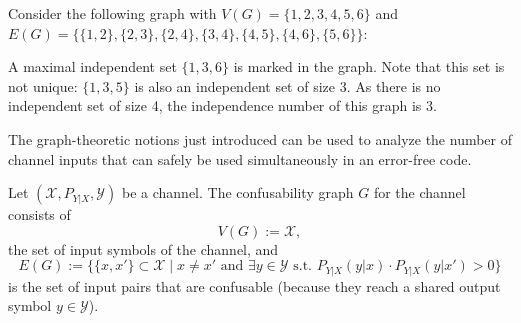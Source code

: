 \begin{example}
Consider the following graph with $V(G) = \{1,2,3,4,5,6\}$ and $E(G) = \{\{1,2\}, \{2,3\}, \{2,4\}, \{3,4\}, \{4,5\}, \{4,6\}, \{5,6\}\}$:
\begin{center}
\end{center}
A maximal independent set $\{1,3,6\}$ is marked in the graph. Note that this set is not unique: $\{1,3,5\}$ is also an independent set of size 3. As there is no independent set of size 4, the independence number of this graph is 3.
\end{example}
The graph-theoretic notions just introduced can be used to analyze the number of channel inputs that can safely be used simultaneously in an error-free code.
\begin{definition}
Let $(\mathcal{X},P_{Y|X},\mathcal{Y})$ be a channel. The confusability graph $G$ for the channel consists of
\[V(G) := \mathcal{X},\]
the set of input symbols of the channel, and
\[
E(G) := \{\{x,x'\} \subset \mathcal{X} \mid x \neq x' \mbox{ and } \exists y \in \mathcal{Y} \mbox{ s.t. } P_{Y|X}(y|x) \cdot P_{Y|X}(y|x') > 0\}
\]
is the set of input pairs that are confusable (because they reach a shared output symbol $y \in \mathcal{Y}$).
\end{definition}


